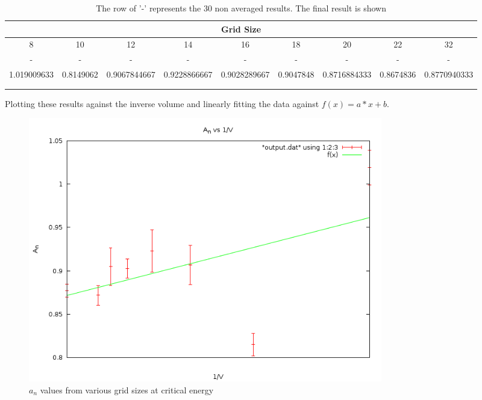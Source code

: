 \documentclass[10pt,a4paper]{article}
\begin{document}
\begin{table}[h]
\centering
\begin{adjustbox}{width=1\textwidth}
\begin{tabular}{ccccccccc}
\hline
\multicolumn{9}{|c|}{Grid Size} \\ \hline
\multicolumn{1}{|c|}{8} & \multicolumn{1}{c|}{10} & \multicolumn{1}{c|}{12} & \multicolumn{1}{c|}{14} & \multicolumn{1}{c|}{16} & \multicolumn{1}{c|}{18} & \multicolumn{1}{c|}{20} & \multicolumn{1}{c|}{22} & \multicolumn{1}{c|}{32} \\ \hline
\multicolumn{1}{|c|}{-} & \multicolumn{1}{c|}{-} & \multicolumn{1}{c|}{-} & \multicolumn{1}{c|}{-} & \multicolumn{1}{c|}{-} & \multicolumn{1}{c|}{-} & \multicolumn{1}{c|}{-} & \multicolumn{1}{c|}{-} & \multicolumn{1}{c|}{-} \\ \hline
\multicolumn{1}{|c|}{1.019009633} & \multicolumn{1}{c|}{0.8149062} & \multicolumn{1}{c|}{0.9067844667} & \multicolumn{1}{c|}{0.9228866667} & \multicolumn{1}{c|}{0.9028289667} & \multicolumn{1}{c|}{0.9047848} & \multicolumn{1}{c|}{0.8716884333} & \multicolumn{1}{c|}{0.8674836} & \multicolumn{1}{c|}{0.8770940333} \\ \hline
\multicolumn{1}{l}{} & \multicolumn{1}{l}{} & \multicolumn{1}{l}{} & \multicolumn{1}{l}{} & \multicolumn{1}{l}{} & \multicolumn{1}{l}{} & \multicolumn{1}{l}{} & \multicolumn{1}{l}{} & \multicolumn{1}{l}{} \\
\multicolumn{1}{l}{} & \multicolumn{1}{l}{} & \multicolumn{1}{l}{} & \multicolumn{1}{l}{} & \multicolumn{1}{l}{} & \multicolumn{1}{l}{} & \multicolumn{1}{l}{} & \multicolumn{1}{l}{} & \multicolumn{1}{l}{}
\end{tabular}
\end{adjustbox}
\caption{The row of '-' represents the 30 non averaged results. The final result is shown}
\end{table}

Plotting these results against the inverse volume and linearly fitting the data against $f(x) = a * x + b$.

\begin{figure}[H]
\centering
\includegraphics[width=0.75\textwidth]{q2variousgrid.png}
\caption{$a_n$ values from various grid sizes at critical energy}
\end{figure}
\end{document}
